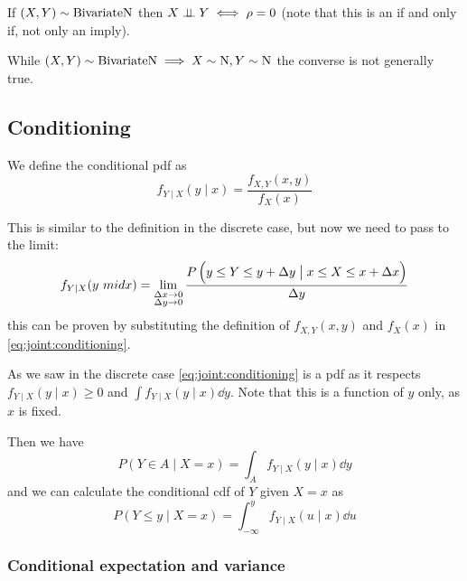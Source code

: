\documentclass[12pt]{extarticle}
\newcommand{\Normal}{{\operatorfont N}}
\newcommand{\BivariateNormal}{{\operatorfont BivariateN}}
\begin{document}
\begin{remark}
    If $(X, Y) \sim \BivariateNormal$ then $X \perp \!\!\! \perp Y \iff \rho = 0$ (note that this is an if and only if, not only an imply).
\end{remark}

\begin{remark}
    While $(X, Y) \sim \BivariateNormal \implies X \sim \Normal, Y \sim \Normal$ the converse is not generally true.
\end{remark}

\subsection{Conditioning}

\begin{definition}
    We define the conditional pdf as
    \begin{equation}
        f_{Y \mid X}(y \mid x) = \frac{f_{X, Y}(x, y)}{f_X(x)} \label{eq:joint:conditioning}
    \end{equation}
\end{definition}

This is similar to the definition in the discrete case, but now we need to pass to the limit:
\begin{equation}
    f_{Y \mid X}(y\ mid x) = \lim_{\substack{\Delta x \to 0 \\ \Delta y \to 0}} \frac{P\left(y \leq Y \leq y + \Delta y \bigm| x \leq X \leq x + \Delta x\right)}{\Delta y}
\end{equation}
this can be proven by substituting the definition of $f_{X, Y}(x,y)$ and $f_X(x)$ in \autoref{eq:joint:conditioning}.


As we saw in the discrete case \autoref{eq:joint:conditioning} is a pdf as it respects $f_{Y \mid X}(y \mid x) \geq 0$ and $\int f_{Y \mid X}(y \mid x) \dd{y}$.
Note that this is a function of $y$ only, as $x$ is fixed.

Then we have
\begin{equation}
    P(Y \in A \mid X = x) = \int_A f_{Y \mid X}(y \mid x) \dd{y}
\end{equation}
and we can calculate the conditional cdf of $Y$ given $X = x$ as
\begin{equation}
    P(Y \leq y  \mid  X = x) = \int_{-\infty}^y f_{Y \mid X}(u \mid x) \dd{u}
\end{equation}

\subsubsection{Conditional expectation and variance}
\end{document}
